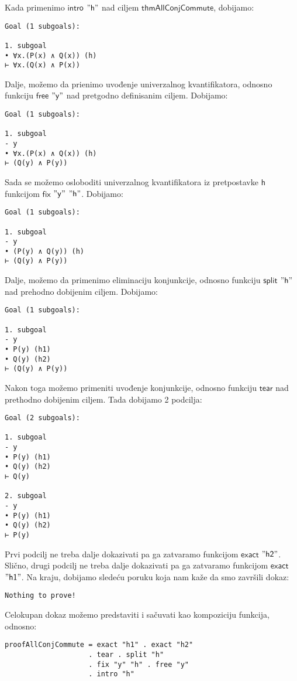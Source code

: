 \documentclass[a4paper,10pt]{article}
\theoremstyle{definition}
\begin{document}
Kada primenimo $\mathsf{intro}$ $"\mathsf{h}"$ nad ciljem $\mathsf{thmAllConjCommute}$, dobijamo:
\begin{verbatim}
Goal (1 subgoals):

1. subgoal
• ∀x.(P(x) ∧ Q(x)) (h)
⊢ ∀x.(Q(x) ∧ P(x))
\end{verbatim}
Dalje, možemo da prienimo uvođenje univerzalnog kvantifikatora, odnosno funkciju $\mathsf{free}$ $"\mathsf{y}"$ nad pretgodno definisanim ciljem. Dobijamo:
\begin{verbatim}
Goal (1 subgoals):

1. subgoal
- y
• ∀x.(P(x) ∧ Q(x)) (h)
⊢ (Q(y) ∧ P(y))
\end{verbatim}
Sada se možemo osloboditi univerzalnog kvantifikatora iz pretpostavke $\mathsf{h}$ funkcijom $\mathsf{fix}$ $"\mathsf{y}"$ $"\mathsf{h}"$. Dobijamo:
\begin{verbatim}
Goal (1 subgoals):

1. subgoal
- y
• (P(y) ∧ Q(y)) (h)
⊢ (Q(y) ∧ P(y))
\end{verbatim}
Dalje, možemo da primenimo eliminaciju konjunkcije, odnosno funkciju $\mathsf{split}$ $"\mathsf{h}"$ nad prehodno dobijenim ciljem. Dobijamo:
\begin{verbatim}
Goal (1 subgoals):

1. subgoal
- y
• P(y) (h1)
• Q(y) (h2)
⊢ (Q(y) ∧ P(y))
\end{verbatim}
Nakon toga možemo primeniti uvođenje konjunkcije, odnosno funkciju $\mathsf{tear}$ nad prethodno dobijenim ciljem. Tada dobijamo 2 podcilja:
\begin{verbatim}
Goal (2 subgoals):

1. subgoal
- y
• P(y) (h1)
• Q(y) (h2)
⊢ Q(y)

2. subgoal
- y
• P(y) (h1)
• Q(y) (h2)
⊢ P(y)
\end{verbatim}
Prvi podcilj ne treba dalje dokazivati pa ga zatvaramo funkcijom $\mathsf{exact}$ $"\mathsf{h2}"$. Slično, drugi podcilj ne treba dalje dokazivati pa ga zatvaramo funkcijom $\mathsf{exact}$ $"\mathsf{h1}"$. Na kraju, dobijamo sledeću poruku koja nam kaže da smo završili dokaz:
\begin{verbatim}
Nothing to prove!
\end{verbatim}

Celokupan dokaz možemo predstaviti i sačuvati kao kompoziciju funkcija, odnosno:
\begin{lstlisting}
proofAllConjCommute = exact "h1" . exact "h2" 
                    . tear . split "h" 
                    . fix "y" "h" . free "y"
                    . intro "h"
\end{lstlisting}
\end{document}
